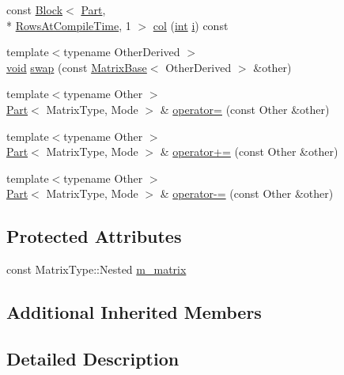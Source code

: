 \begin{DoxyCompactItemize}
\item 
const \hyperlink{class_block}{Block}$<$ \hyperlink{class_part}{Part}, \\*
\hyperlink{class_matrix_base_aaa53a8ec1bc1ba52b1e50631dac15d6da10c48c1361376cbd5ef62a18966f2691}{Rows\-At\-Compile\-Time}, 1 $>$ \hyperlink{class_part_a676bd1bd17e7c2a0e10bc3594dfbb186}{col} (\hyperlink{ioapi_8h_a787fa3cf048117ba7123753c1e74fcd6}{int} \hyperlink{uavobjecttemplate_8m_a6f6ccfcf58b31cb6412107d9d5281426}{i}) const 
\item 
{\footnotesize template$<$typename Other\-Derived $>$ }\\\hyperlink{group___u_a_v_objects_plugin_ga444cf2ff3f0ecbe028adce838d373f5c}{void} \hyperlink{class_part_a7e83c6408f856ec2643ccac748e8e7fd}{swap} (const \hyperlink{class_matrix_base}{Matrix\-Base}$<$ Other\-Derived $>$ \&other)
\item 
{\footnotesize template$<$typename Other $>$ }\\\hyperlink{class_part}{Part}$<$ Matrix\-Type, Mode $>$ \& \hyperlink{class_part_a04dd2ddb31de5d9633798da9984dffa0}{operator=} (const Other \&other)
\item 
{\footnotesize template$<$typename Other $>$ }\\\hyperlink{class_part}{Part}$<$ Matrix\-Type, Mode $>$ \& \hyperlink{class_part_ac1e77710f54a04649b16d110c5298050}{operator+=} (const Other \&other)
\item 
{\footnotesize template$<$typename Other $>$ }\\\hyperlink{class_part}{Part}$<$ Matrix\-Type, Mode $>$ \& \hyperlink{class_part_abce73876ca9e874e68c036f38e74ffc4}{operator-\/=} (const Other \&other)
\end{DoxyCompactItemize}
\subsection*{Protected Attributes}
\begin{DoxyCompactItemize}
\item 
const Matrix\-Type\-::\-Nested \hyperlink{class_part_aac5701f68177843a40fbe6e9b8d675da}{m\-\_\-matrix}
\end{DoxyCompactItemize}
\subsection*{Additional Inherited Members}


\subsection{Detailed Description}
